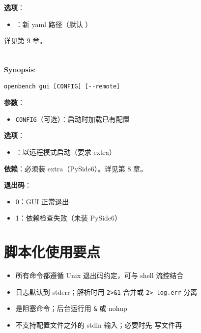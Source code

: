 \textbf{选项}：

\begin{itemize}
  \item {}：新 yaml 路径（默认 ）
\end{itemize}

详见第 9 章。

\section{}

\textbf{Synopsis}:

\begin{verbatim}
openbench gui [CONFIG] [--remote]
\end{verbatim}

\textbf{参数}：

\begin{itemize}
  \item \texttt{CONFIG}（可选）：启动时加载已有配置
\end{itemize}

\textbf{选项}：

\begin{itemize}
  \item {}：以远程模式启动（要求 \cli{[remote]} extra）
\end{itemize}

\textbf{依赖}：必须装 \cli{[gui]} extra（PySide6）。详见第 8 章。

\textbf{退出码}：

\begin{itemize}
  \item 0：GUI 正常退出
  \item 1：依赖检查失败（未装 PySide6）
\end{itemize}

\section{脚本化使用要点}

\begin{itemize}
  \item 所有命令都遵循 Unix 退出码约定，可与 shell 流控结合
  \item 日志默认到 stderr；解析时用 \texttt{2>\&1} 合并或 \texttt{2> log.err} 分离
  \item {} 是阻塞命令；后台运行用 \texttt{\&} 或 nohup
  \item 不支持配置文件之外的 stdin 输入；必要时先  写文件再 
\end{itemize}
